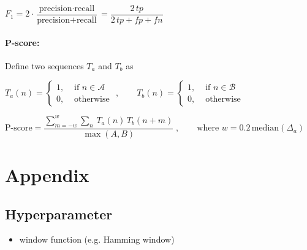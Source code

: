 \documentclass{article}
\begin{document}
$F_1 = 2 \cdot \dfrac{\text{precision} \cdot \text{recall}}{\text{precision} + \text{recall}} = \dfrac{2\, tp}{2\, tp + fp + fn}$

\paragraph{P-score:} Define two sequences $T_a$ and $T_b$ as 

$T_a(n) = \begin{cases}
	1, &\text{ if } n \in \mathcal A \\
	0 , & \text{ otherwise }
\end{cases}, \qquad T_b(n) = \begin{cases}
	1, &\text{ if } n \in \mathcal B \\
	0 , & \text{ otherwise }
\end{cases}$

$\text{P-score} = \dfrac{\displaystyle \sum_{m=-w}^w  \sum_{n}\,  T_a(n)\,  T_b(n+m)}{\max(A,B)} \;, \qquad \text{where } w = 0.2 \, \text{median}(\Delta_a)$ 











\section{Appendix}

\subsection{Hyperparameter} 
\begin{itemize}
\item window function (e.g. Hamming window)
\end{itemize}




\end{document}
